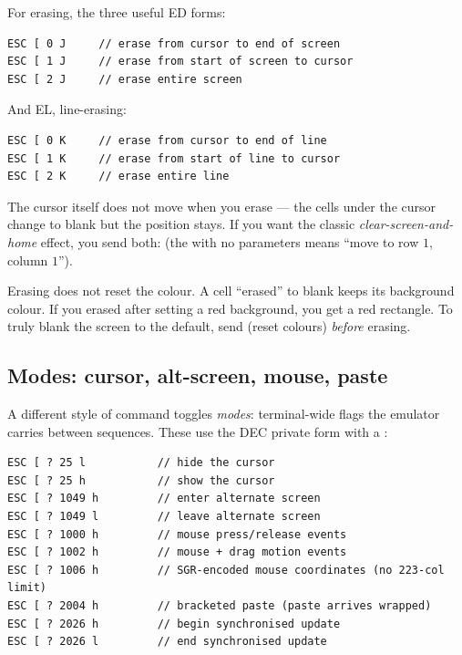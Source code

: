 For erasing, the three useful ED forms:

\begin{lstlisting}
ESC [ 0 J     // erase from cursor to end of screen
ESC [ 1 J     // erase from start of screen to cursor
ESC [ 2 J     // erase entire screen
\end{lstlisting}

And EL, line-erasing:

\begin{lstlisting}
ESC [ 0 K     // erase from cursor to end of line
ESC [ 1 K     // erase from start of line to cursor
ESC [ 2 K     // erase entire line
\end{lstlisting}

The cursor itself does not move when you erase --- the cells under the
cursor change to blank but the position stays. If you want the
classic \emph{clear-screen-and-home} effect, you send both:
\code{ESC [ 2 J ESC [ H} (the  with no parameters means ``move
to row $1$, column $1$'').

\begin{warning}
Erasing does not reset the colour. A cell ``erased'' to blank keeps
its background colour. If you erased after setting a red background,
you get a red rectangle. To truly blank the screen to the default,
send \code{ESC [ 0 m} (reset colours) \emph{before} erasing.
\end{warning}

\subsection{Modes: cursor, alt-screen, mouse, paste}

A different style of command toggles \emph{modes}: terminal-wide flags
the emulator carries between sequences. These use the DEC private form
with a :

\begin{lstlisting}
ESC [ ? 25 l           // hide the cursor
ESC [ ? 25 h           // show the cursor
ESC [ ? 1049 h         // enter alternate screen
ESC [ ? 1049 l         // leave alternate screen
ESC [ ? 1000 h         // mouse press/release events
ESC [ ? 1002 h         // mouse + drag motion events
ESC [ ? 1006 h         // SGR-encoded mouse coordinates (no 223-col limit)
ESC [ ? 2004 h         // bracketed paste (paste arrives wrapped)
ESC [ ? 2026 h         // begin synchronised update
ESC [ ? 2026 l         // end synchronised update
\end{lstlisting}

